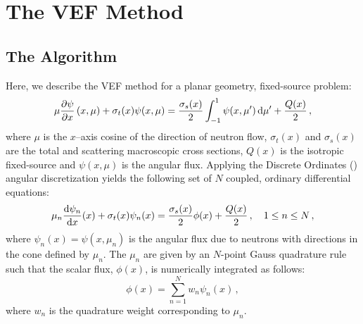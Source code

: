 
\newcommand{\rell}{^\ell} %
\newcommand{\relll}{^{\ell+1}} %
\newcommand{\rellh}{^{\ell+1/2}} %

\newcommand{\paren}[1]{\left(#1\right)} 
\newcommand{\br}[1]{\left[#1\right]}
\newcommand{\curl}[1]{\left\{#1\right\}}

\newcommand{\eddphi}[1]{\edd_{#1}\phi_{#1}}
\newcommand{\ALPHA}[2]{\frac{#1}{\sigma_{t,#2} h_{#2}}}

\section{The VEF Method}
\subsection{The Algorithm}
Here, we describe the VEF method for a planar geometry, fixed-source problem:
	\begin{equation} 
		\mu \pderiv{\psi}{x} \paren{x, \mu} + \sigma_t(x) \psi(x,\mu) = 
			\frac{\sigma_s(x)}{2} \int_{-1}^1 \psi(x,\mu') \ud \mu' + \frac{Q(x)}{2} \,,
	\end{equation}
where $\mu$ is the $x$--axis cosine of the direction of neutron flow,  $\sigma_t(x)$ and $\sigma_s(x)$ are the total and scattering macroscopic cross sections, $Q(x)$ is the isotropic fixed-source and $\psi(x, \mu)$ is the angular flux. Applying the Discrete Ordinates (\SN) angular discretization yields the following set of $N$ coupled, ordinary differential equations: 
	\begin{equation} \label{eq:sn}
		\mu_n \frac{\mathop{}\!\mathrm{d} \psi_n}{\mathop{}\!\mathrm{d} x}(x) + \sigma_t(x) \psi_n(x) = 
		\frac{\sigma_s(x)}{2} \phi(x) + \frac{Q(x)}{2} \,, \quad 1 \leq n \leq N \,,
	\end{equation}
where $\psi_n(x) = \psi(x, \mu_n)$ is the angular flux due to neutrons with directions in the cone defined by $\mu_n$.  The $\mu_n$ are given by an $N$-point Gauss quadrature rule such that the scalar flux, $\phi(x)$, is numerically integrated as follows: 
	\begin{equation} \label{eq:phiquad}
		\phi(x) = \sum_{n=1}^N w_n \psi_n(x) \,,
	\end{equation}
where $w_n$ is the quadrature weight corresponding to $\mu_n$. 

